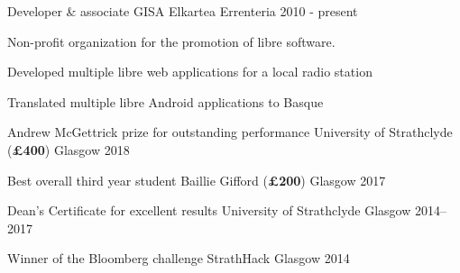 \documentclass[11pt, a4paper]{awesome-cv}
\begin{document}
\begin{cventries}
    \cventry
      {Developer \& associate} %
      {GISA Elkartea}
      {Errenteria} %
      {2010 - present} %
      {
        Non-profit organization for the promotion of libre
        software.\vspace{1.1\baselineskip}
        \begin{cvitems} %
          \item {Developed multiple libre web applications for a local radio
              station}
          \item {Translated multiple libre Android applications to Basque}
        \end{cvitems}
      }

\end{cventries}

\newpage


\begin{cvhonors}
  
    \cvhonor
      {Andrew McGettrick prize for outstanding performance} %
      {University of Strathclyde (\textbf{£400})} %
      {Glasgow} %
      {2018} %
  
    \cvhonor
      {Best overall third year student} %
      {Baillie Gifford (\textbf{£200})} %
      {Glasgow} %
      {2017} %
  
    \cvhonor
      {Dean's Certificate for excellent results} %
      {University of Strathclyde} %
      {Glasgow} %
      {2014--2017} %
  
    \cvhonor
      {Winner of the Bloomberg challenge} %
      {StrathHack} %
      {Glasgow} %
      {2014} %
\end{cvhonors}
\end{document}
